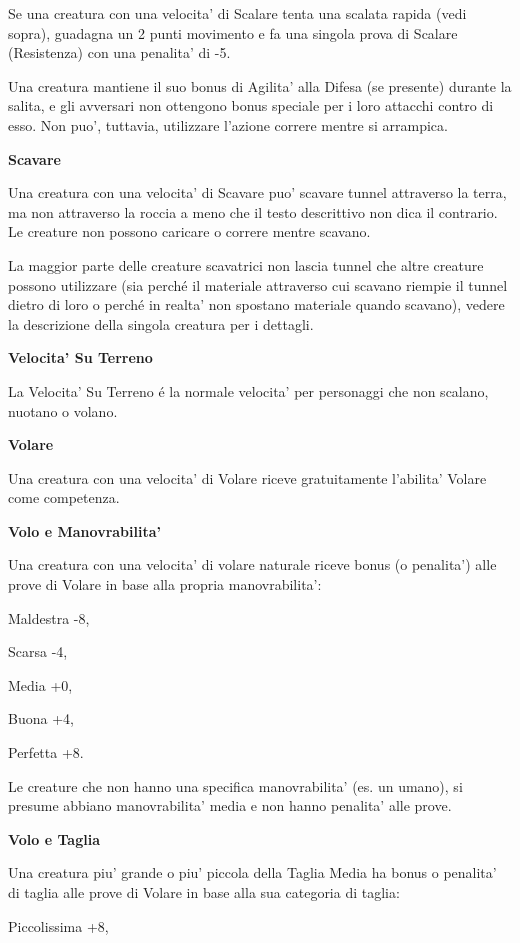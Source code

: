\documentclass[a4paper,11pt,twoside,openany]{book}
\begin{document}
{Se una creatura con una velocita' di Scalare tenta una scalata rapida (vedi sopra), guadagna un 2 punti movimento e fa una singola prova di Scalare (Resistenza) con una penalita' di -5. 

Una creatura mantiene il suo bonus di Agilita' alla Difesa (se presente) durante la salita, e gli avversari non ottengono bonus speciale per i loro attacchi contro di esso. Non puo', tuttavia, utilizzare l'azione correre mentre si arrampica.

\textbf{Scavare}

Una creatura con una velocita' di Scavare puo' scavare tunnel attraverso la terra, ma non attraverso la roccia a meno che il testo descrittivo non dica il contrario. Le creature non possono caricare o correre mentre scavano.

La maggior parte delle creature scavatrici non lascia tunnel che altre creature possono utilizzare (sia perché il materiale attraverso cui scavano riempie il tunnel dietro di loro o perché in realta' non spostano materiale quando scavano), vedere la descrizione della singola creatura per i dettagli.

\textbf{Velocita' Su Terreno}

La Velocita' Su Terreno é la normale velocita' per personaggi che non scalano, nuotano o volano.

\textbf{Volare}

Una creatura con una velocita' di Volare riceve gratuitamente l'abilita' Volare come competenza.

\textbf{Volo e Manovrabilita'}

Una creatura con una velocita' di volare naturale riceve bonus (o penalita') alle prove di Volare in base alla propria manovrabilita':

Maldestra -8,

Scarsa -4,

Media +0,

Buona +4,

Perfetta +8.

Le creature che non hanno una specifica manovrabilita' (es. un umano), si presume abbiano manovrabilita' media e non hanno penalita' alle
prove.

\textbf{Volo e Taglia}

Una creatura piu' grande o piu' piccola della Taglia Media ha bonus o penalita' di taglia alle prove di Volare in base alla sua categoria di taglia:

Piccolissima +8,

}
\end{document}
